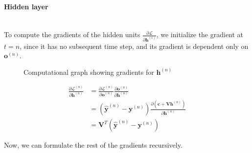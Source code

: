 \documentclass{article}
\numberwithin{equation}{section}
\begin{document}
\paragraph{Hidden layer}\mbox{}\\
To compute the gradients of the hidden units $\frac{\partial \mathcal{L}}{\partial \bm{h}^{(t)}}$, we initialize the gradient at $t = n$, since it has no subsequent time step, and its gradient is dependent only on $\bm{o}^{(n)}$.

\begin{figure}[h!]
\centering
{}
\caption{Computational graph showing gradients for $\bm{h}^{(n)}$}
\label{fig:grad-hn}
\end{figure}

\begin{equation}
\label{eqn:backward-hn}
\begin{split}
	\frac{\partial \mathcal{L}^{(n)}}{\partial \bm{h}^{(n)}}
		&= \frac{\partial \mathcal{L}^{(n)}}{\partial \bm{o}^{(n)}} \frac{\partial \bm{o}^{(n)}}{\partial \bm{h}^{(n)}} \\
		&= (\hat{\bm{y}}^{(n)} - \bm{y}^{(n)}) \frac{\partial(\bm{c} + \bm{V}\bm{h}^{(n)})}{\partial \bm{h}^{(n)}} \\
		&= \bm{V}^T(\hat{\bm{y}}^{(n)} - \bm{y}^{(n)})
\end{split}
\end{equation}

Now, we can formulate the rest of the gradients recursively.
\end{document}
